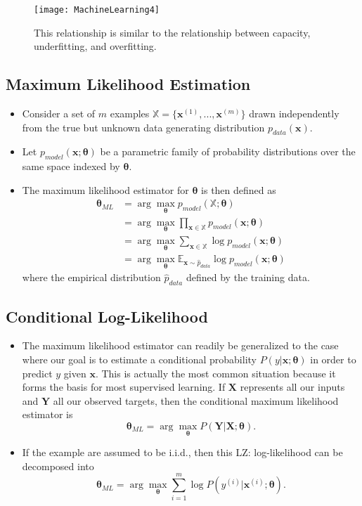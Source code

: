     \begin{figure}
        \caption{ This relationship is similar to the relationship between capacity, underfitting, and overfitting.}
        \texttt{[image: MachineLearning4]}\label{4}
    \end{figure}
\subsection{Maximum Likelihood Estimation}
    \begin{itemize}
        \item Consider a set of $m$ examples $\mathbb X=\{\bm x^{(1)},...,\bm x^{(m)}\}$ drawn independently from the true but unknown data generating distribution $p_{data}(\bm x)$.
        \item Let $p_{model}(\bm x;\bm \theta)$ be a parametric family of probability distributions over the same space indexed by $\bm \theta$.
        \item The maximum likelihood estimator for $\bm \theta$ is then defined as 
        \begin{equation*}
        \begin{split}
        \bm \theta_{ML} &= \arg \max_{\bm \theta}p_{model}(\mathbb X;\bm \theta) \\
        &=\arg \max_{\bm \theta}\prod_{\bm x \in \mathbb X} p_{model}(\bm x;\bm \theta)\\
        &=\arg \max_{\bm \theta}\sum_{\bm x \in \mathbb X} \log p_{model}(\bm x;\bm \theta)\\
        &=\arg \max_{\bm \theta}\mathbb E_{\bm x \sim \hat{p}_{data}} \log p_{model}(\bm x;\bm \theta)
        \end{split}
        \end{equation*}
        where the empirical distribution $\hat{p}_{data}$ defined by the training data.
    \end{itemize}

\subsection{Conditional Log-Likelihood}
    \begin{itemize}
        \item The maximum likelihood estimator can readily be generalized to the case where our goal is to estimate a conditional probability $P(y |\bm x;\bm \theta)$ in order to predict $y$ given $\bm x$. This is actually the most common situation because it forms the basis for most supervised learning. If $\bm X$ represents all our inputs and $\bm Y$	all our observed targets, then the conditional maximum likelihood estimator is
        $$
        \bm \theta_{ML} =\arg\max_{\bm \theta}P(\bm Y|\bm X;\bm \theta).
        $$
        \item If the example are assumed to be i.i.d., then this{\color{red} LZ: log-likelihood} can be decomposed into
        $$
        \bm \theta_{ML} =\arg\max_{\bm \theta}\sum_{i=1}^{m}\log P(y^{(i)}|\bm x^{(i)};\bm \theta).
        $$
    \end{itemize}

